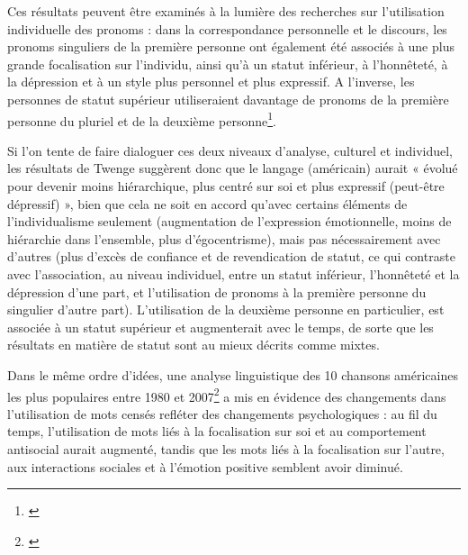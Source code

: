 Ces résultats peuvent être examinés à la lumière des recherches sur l'utilisation individuelle des pronoms : dans la correspondance personnelle et le discours, les pronoms singuliers de la première personne ont également été associés à une plus grande focalisation sur l'individu, ainsi qu'à un statut inférieur, à l'honnêteté, à la dépression et à un style plus personnel et plus expressif. A l’inverse, les personnes de statut supérieur utiliseraient davantage de pronoms de la première personne du pluriel et de la deuxième personne\footnote{\cite{nerbonne_secret_2014}}.

Si l’on tente de faire dialoguer ces deux niveaux d’analyse, culturel et individuel, les résultats de Twenge suggèrent donc que le langage (américain) aurait « évolué pour devenir moins hiérarchique, plus centré sur soi et plus expressif (peut-être dépressif) », bien que cela ne soit en accord qu'avec certains éléments de l'individualisme seulement (augmentation de l'expression émotionnelle, moins de hiérarchie dans l'ensemble, plus d'égocentrisme), mais pas nécessairement avec d'autres (plus d'excès de confiance et de revendication de statut, ce qui contraste avec l'association, au niveau individuel, entre un statut inférieur, l'honnêteté et la dépression d'une part, et l'utilisation de pronoms à la première personne du singulier d'autre part). L'utilisation de la deuxième personne en particulier, est associée à un statut supérieur et augmenterait avec le temps, de sorte que les résultats en matière de statut sont au mieux décrits comme mixtes.

Dans le même ordre d'idées, une analyse linguistique des 10 chansons américaines les plus populaires entre 1980 et 2007\footnote{\cite{dewall_tuning_2011}} a mis en évidence des changements dans l'utilisation de mots censés refléter des changements psychologiques : au fil du temps, l'utilisation de mots liés à la focalisation sur soi et au comportement antisocial aurait augmenté, tandis que les mots liés à la focalisation sur l'autre, aux interactions sociales et à l'émotion positive semblent avoir diminué.

